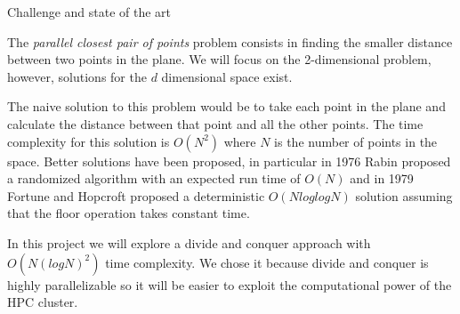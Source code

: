 Challenge and state of the art

The \textit{parallel closest pair of points} problem consists 
in finding the smaller distance between two points in the plane.
We will focus on the 2-dimensional problem, however, solutions for 
the $d$ dimensional space exist.

The naive solution to this problem would be to take each point 
in the plane and calculate the distance between that point and all 
the other points. The time complexity for this solution is $O(N^2)$
where $N$ is the number of points in the space.
Better solutions have been proposed, in particular in 1976 
Rabin proposed a randomized algorithm with an expected run time 
of $O(N)$ and in 1979 Fortune and Hopcroft proposed a 
deterministic $O(N log log N)$ solution \cite{Fortune_Hopcroft}
assuming that the floor operation takes constant time.

In this project we will explore a divide and conquer approach 
with $O(N(logN)^2)$ time complexity. We chose it because
divide and conquer is highly parallelizable so it will be easier
to exploit the computational power of the HPC cluster.